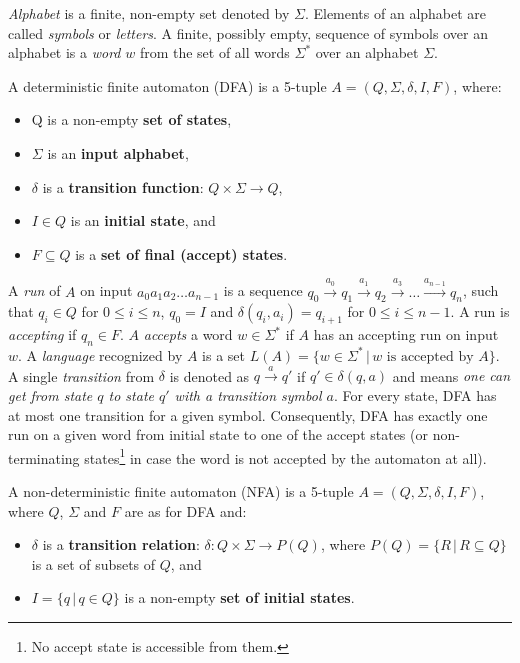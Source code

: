 \emph{Alphabet} is a finite, non-empty set denoted by $\Sigma$. Elements of an alphabet are called \emph{symbols} or \emph{letters}. A finite, possibly empty, sequence of symbols over an alphabet is a \emph{word} $w$ from the set of all words $\Sigma^*$ over an alphabet $\Sigma$.

\begin{definition} \hfill \newline
    A deterministic finite automaton (DFA) is a 5-tuple $A = (Q, \Sigma, \delta, I, F)$, where:
    \begin{itemize}
        \item Q is a non-empty \textbf{set of states},
        \item $\Sigma$ is an \textbf{input alphabet},
        \item $\delta$ is a \textbf{transition function}: $Q \times \Sigma \rightarrow{} Q$,
        \item $I \in Q$ is an \textbf{initial state}, and
        \item $F \subseteq Q$ is a \textbf{set of final (accept) states}.
    \end{itemize}
\end{definition}

A \emph{run} of $A$ on input $a_0a_1a_2 \ldots a_{n-1}$ is a sequence $q_0 \xrightarrow{a_0} q_1 \xrightarrow{a_1} q_2 \xrightarrow{a_3} \ldots \xrightarrow{a_{n-1}} q_n$, such that $q_i \in Q$ for $0 \leq i \leq n$, $q_0 = I$ and $\delta(q_i, a_i) = q_{i+1}$ for $0 \leq i \leq n - 1$. A run is \emph{accepting} if $q_n \in F$. $A$ \emph{accepts} a word $w \in \Sigma^*$ if $A$ has an accepting run on input $w$. A \emph{language} recognized by $A$ is a set $L(A) = \{w \in \Sigma^* \,\vert\, w \text{ is accepted by } A\}$. A single \emph{transition} from $\delta$ is denoted as $q \xrightarrow{a} q'$ if $q' \in \delta(q, a)$ and means \textit{one can get from state $q$ to state $q'$ with a transition symbol $a$}. For every state, DFA has at most one transition for a given symbol. Consequently, DFA has exactly one run on a given word from initial state to one of the accept states (or non-terminating states\footnote{No accept state is accessible from them.} in case the word is not accepted by the automaton at all).

\begin{definition} \hfill \newline
    A non-deterministic finite automaton (NFA) is a 5-tuple $A = (Q, \Sigma, \delta, I, F)$, where $Q$, $\Sigma$ and $F$ are as for DFA and:
    \begin{itemize}
        \item $\delta$ is a \textbf{transition relation}: $\delta: Q \times \Sigma \rightarrow{} P(Q)$, where $P(Q) = \{R \,\vert\, R \subseteq Q\}$ is a set of subsets of $Q$, and
        \item $I = \{q \,\vert\, q \in Q\}$ is a non-empty \textbf{set of initial states}.
    \end{itemize}
\end{definition}

